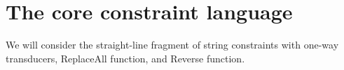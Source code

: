 
\section{The core constraint language}\label{sec-core}

We will consider the straight-line fragment of string constraints with one-way transducers, ReplaceAll function, and Reverse function.